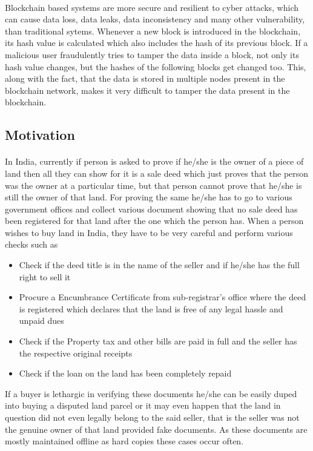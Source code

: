 \documentclass{article}
\begin{document}
        \paragraph{}
        Blockchain based systems are more secure and resilient to cyber attacks, which can cause data loss, data leaks, data inconsistency and many other vulnerability, than traditional sytems. Whenever a new block is introduced in the blockchain, its hash value is calculated which also includes the hash of its previous block. If a malicious user fraudulently tries to tamper the data inside a block, not only its hash value changes, but the hashes of the following blocks get changed too. This, along with the fact, that the data is stored in multiple nodes present in the blockchain network, makes it very difficult to tamper the data present in the blockchain.
        
        \paragraph{}
        
    \subsection{Motivation}
        \paragraph{}
        In India, currently if person is asked to prove if he/she is the owner of a piece of land then all they can show for it is a sale deed which just proves that the person was the owner at a particular time, but that person cannot prove that he/she is still the owner of that land. For proving the same he/she has to go to various government offices and collect various document showing that no sale deed has been registered for that land after the one which the person has. When a person wishes to buy land in India, they have to be very careful and perform various checks such as
        \begin{itemize}
            \item Check if the deed title is in the name of the seller and if he/she has the full right to sell it
            \item Procure a Encumbrance Certificate from sub-registrar's office where the deed is registered which declares that the land is free of any legal hassle and unpaid dues
            \item Check if the Property tax and other bills are paid in full and the seller has the respective original receipts
            \item Check if the loan on the land has been completely repaid
        \end{itemize}
        If a buyer is lethargic in verifying these documents he/she can be easily duped into buying a disputed land parcel or it may even happen that the land in question did not even legally belong to the said seller, that is the seller was not the genuine owner of that land provided fake documents. As these documents are mostly maintained offline as hard copies these cases occur often.
\end{document}
